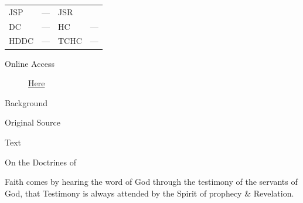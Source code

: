 					\begin{tabular}{p{0.5in}p{1in}p{0.5in}p{1in}}
					JSP	 	& ---		& JSR 		&  \\
					DC	 	& ---		& HC 		& --- \\
					HDDC 	& ---		& TCHC 		& --- \\
					\end{tabular}
				
				\begin{description}
					\item[Online Access] \href{https://www.josephsmithpapers.org/paper-summary/discourse-between-circa-26-june-and-circa-2-july-1839-as-reported-by-willard-richards/1}{Here}
				\end{description}
				
				\begin{description}
					\item[Background]
				\end{description}
				
				
				\begin{description}
					\item[Original Source]
				\end{description}
				
				
				\begin{description}
					\item[Text]
				\end{description}
				
 
					\medskip

					\begin{tightcenter}
						On the Doctrines of

					\end{tightcenter}

					Faith comes by hearing the word of God through the testimony of the servants of God, that Testimony is always attended by the Spirit of prophecy \& Revelation.

